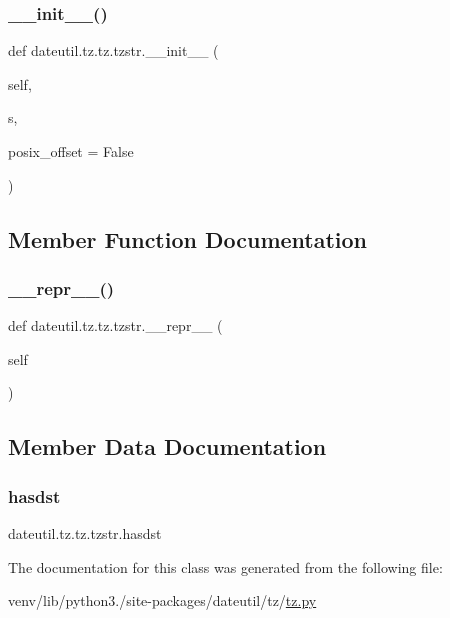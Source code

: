 \subsubsection{\texorpdfstring{\+\_\+\+\_\+init\+\_\+\+\_\+()}{\_\_init\_\_()}}
{\footnotesize\ttfamily def dateutil.\+tz.\+tz.\+tzstr.\+\_\+\+\_\+init\+\_\+\+\_\+ (\begin{DoxyParamCaption}\item[{}]{self,  }\item[{}]{s,  }\item[{}]{posix\+\_\+offset = {\ttfamily False} }\end{DoxyParamCaption})}



\subsection{Member Function Documentation}
\mbox{\label{classdateutil_1_1tz_1_1tz_1_1tzstr_a5bd0aa894d8dffbcff503e5d4f15eeac}} 
\subsubsection{\texorpdfstring{\+\_\+\+\_\+repr\+\_\+\+\_\+()}{\_\_repr\_\_()}}
{\footnotesize\ttfamily def dateutil.\+tz.\+tz.\+tzstr.\+\_\+\+\_\+repr\+\_\+\+\_\+ (\begin{DoxyParamCaption}\item[{}]{self }\end{DoxyParamCaption})}



\subsection{Member Data Documentation}
\mbox{\label{classdateutil_1_1tz_1_1tz_1_1tzstr_aad9666c7b79662b78a1fc66a8ce0f215}} 
\subsubsection{\texorpdfstring{hasdst}{hasdst}}
{\footnotesize\ttfamily dateutil.\+tz.\+tz.\+tzstr.\+hasdst}



The documentation for this class was generated from the following file\+:\begin{DoxyCompactItemize}
\item 
venv/lib/python3./site-\/packages/dateutil/tz/\hyperlink{tz_8py}{tz.\+py}\end{DoxyCompactItemize}

